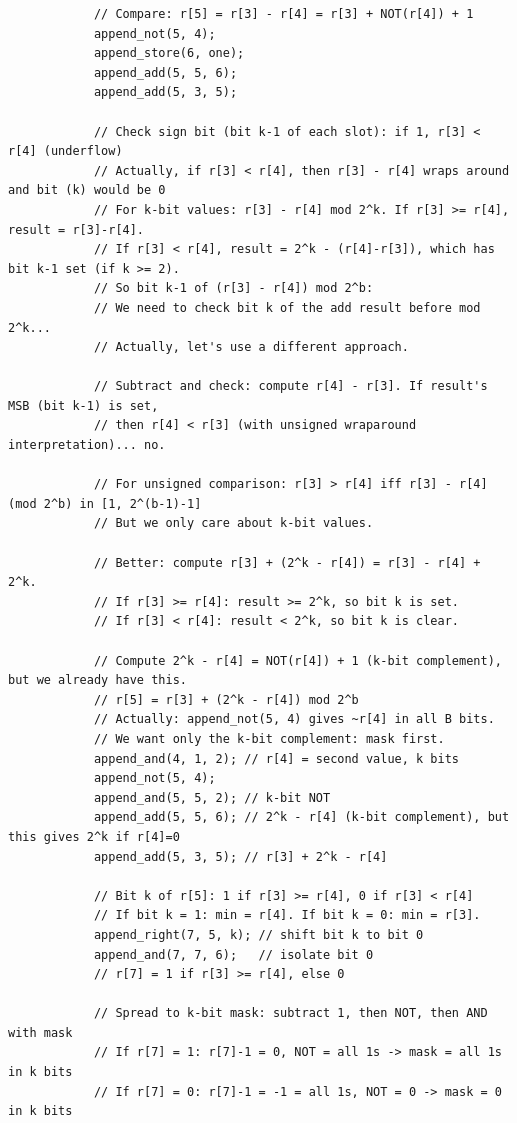 \documentclass[11pt,a4paper]{article}
\begin{document}
\begin{lstlisting}
            // Compare: r[5] = r[3] - r[4] = r[3] + NOT(r[4]) + 1
            append_not(5, 4);
            append_store(6, one);
            append_add(5, 5, 6);
            append_add(5, 3, 5);

            // Check sign bit (bit k-1 of each slot): if 1, r[3] < r[4] (underflow)
            // Actually, if r[3] < r[4], then r[3] - r[4] wraps around and bit (k) would be 0
            // For k-bit values: r[3] - r[4] mod 2^k. If r[3] >= r[4], result = r[3]-r[4].
            // If r[3] < r[4], result = 2^k - (r[4]-r[3]), which has bit k-1 set (if k >= 2).
            // So bit k-1 of (r[3] - r[4]) mod 2^b:
            // We need to check bit k of the add result before mod 2^k...
            // Actually, let's use a different approach.

            // Subtract and check: compute r[4] - r[3]. If result's MSB (bit k-1) is set,
            // then r[4] < r[3] (with unsigned wraparound interpretation)... no.

            // For unsigned comparison: r[3] > r[4] iff r[3] - r[4] (mod 2^b) in [1, 2^(b-1)-1]
            // But we only care about k-bit values.

            // Better: compute r[3] + (2^k - r[4]) = r[3] - r[4] + 2^k.
            // If r[3] >= r[4]: result >= 2^k, so bit k is set.
            // If r[3] < r[4]: result < 2^k, so bit k is clear.

            // Compute 2^k - r[4] = NOT(r[4]) + 1 (k-bit complement), but we already have this.
            // r[5] = r[3] + (2^k - r[4]) mod 2^b
            // Actually: append_not(5, 4) gives ~r[4] in all B bits.
            // We want only the k-bit complement: mask first.
            append_and(4, 1, 2); // r[4] = second value, k bits
            append_not(5, 4);
            append_and(5, 5, 2); // k-bit NOT
            append_add(5, 5, 6); // 2^k - r[4] (k-bit complement), but this gives 2^k if r[4]=0
            append_add(5, 3, 5); // r[3] + 2^k - r[4]

            // Bit k of r[5]: 1 if r[3] >= r[4], 0 if r[3] < r[4]
            // If bit k = 1: min = r[4]. If bit k = 0: min = r[3].
            append_right(7, 5, k); // shift bit k to bit 0
            append_and(7, 7, 6);   // isolate bit 0
            // r[7] = 1 if r[3] >= r[4], else 0

            // Spread to k-bit mask: subtract 1, then NOT, then AND with mask
            // If r[7] = 1: r[7]-1 = 0, NOT = all 1s -> mask = all 1s in k bits
            // If r[7] = 0: r[7]-1 = -1 = all 1s, NOT = 0 -> mask = 0 in k bits


\end{lstlisting}
\end{document}
